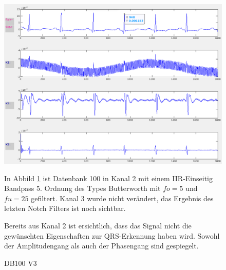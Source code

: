 \documentclass[a4paper,12pt,titlepage]{scrartcl}
\begin{document}
\begin{figure}[ht]
    \begin{minipage}[t]{0.5\linewidth}
        \centering
        \includegraphics[width=0.9\linewidth, valign=t]{Assets/LaborBMT-15-40-04.png}
        \caption{DB100 V3}
        \label{db100v3}
    \end{minipage}%
    \begin{minipage}[t]{0.5\linewidth}
        In Abbild \ref{db100v3} ist Datenbank 100 in Kanal 2 mit einem IIR-Einseitig Bandpass 5. Ordnung des Types Butterworth mit $fo=5$ und $fu=25$ gefiltert. Kanal 3 wurde nicht verändert, das Ergebnis des letzten Notch Filters ist noch sichtbar.

        Bereits aus Kanal 2 ist ersichtlich, dass das Signal nicht die gewünschten Eigenschaften zur QRS-Erkennung haben wird. Sowohl der Amplitudengang als auch der Phasengang sind gespiegelt.
    \end{minipage}
\end{figure}
\end{document}
